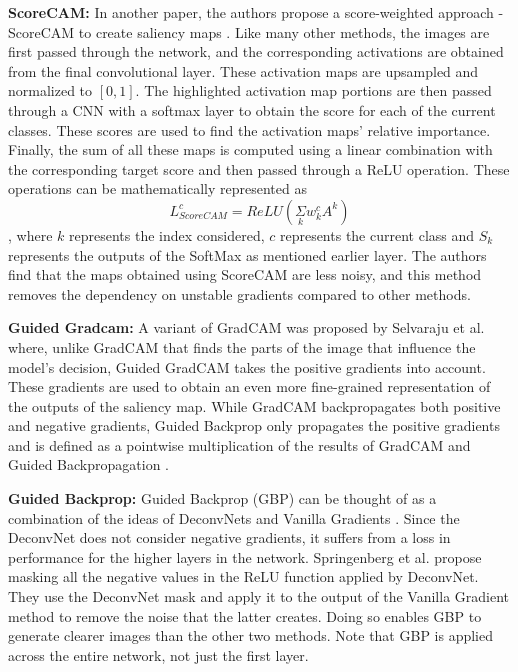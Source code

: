 \documentclass[a4paper,11pt,openright]{book}
\begin{document}
\textbf{ScoreCAM: }
In another paper, the authors propose a score-weighted approach - ScoreCAM to create saliency maps \cite{wangScoreCAMScoreWeightedVisual2020}. Like many other methods, the images are first passed through the network, and the corresponding activations are obtained from the final convolutional layer. These activation maps are upsampled and normalized to $[0,1]$. The highlighted activation map portions are then passed through a CNN with a softmax layer to obtain the score for each of the current classes. These scores are used to find the activation maps' relative importance. Finally, the sum of all these maps is computed using a linear combination with the corresponding target score and then passed through a ReLU operation. These operations can be mathematically represented as $$L^{c}_{ScoreCAM} = ReLU(\underset{k}\Sigma w_{k}^{c}A^{k})$$, where $k$ represents the index considered, $c$ represents the current class and $S_k$ represents the outputs of the SoftMax as mentioned earlier layer. The authors find that the maps obtained using ScoreCAM are less noisy, and this method removes the dependency on unstable gradients compared to other methods.

\textbf{Guided Gradcam: }
A variant of GradCAM \cite{selvarajuGradCAMVisualExplanations} was proposed by Selvaraju et al. \cite{selvarajuGradCAMWhyDid2017} where, unlike GradCAM that finds the parts of the image that influence the model's decision, Guided GradCAM takes the positive gradients into account. These gradients are used to obtain an even more fine-grained representation of the outputs of the saliency map. While GradCAM backpropagates both positive and negative gradients, Guided Backprop only propagates the positive gradients and is defined as a pointwise multiplication of the results of GradCAM and Guided Backpropagation \cite{springenbergStrivingSimplicityAll2015}.

\textbf{Guided Backprop: } Guided Backprop (GBP) \cite{springenbergStrivingSimplicityAll2015} can be thought of as a combination of the ideas of DeconvNets \cite{zeilerVisualizingUnderstandingConvolutional2013} and Vanilla Gradients \cite{simonyanDeepConvolutionalNetworks2014}. Since the DeconvNet does not consider negative gradients, it suffers from a loss in performance for the higher layers in the network. Springenberg et al. propose masking all the negative values in the ReLU function applied by DeconvNet. They use the DeconvNet mask and apply it to the output of the Vanilla Gradient method to remove the noise that the latter creates. Doing so enables GBP to generate clearer images than the other two methods. Note that GBP is applied across the entire network, not just the first layer.
\end{document}
